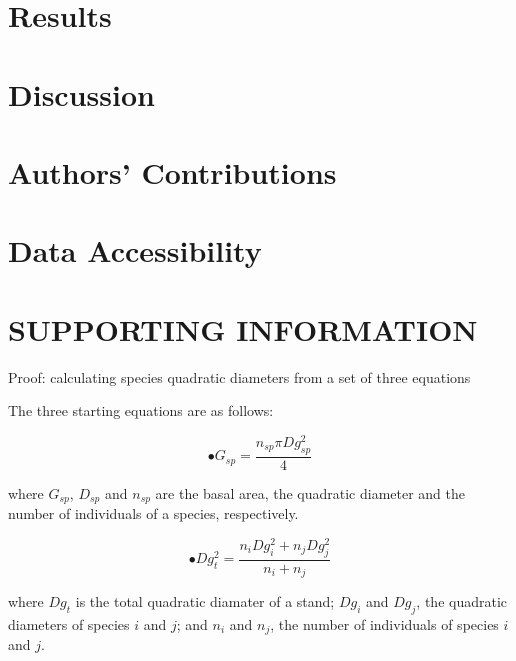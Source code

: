 \documentclass[a4paper]{article}
\begin{document}
\section*{Results}

\section*{Discussion}


\section*{Authors' Contributions}

\section*{Data Accessibility}




\clearpage

\section*{SUPPORTING INFORMATION}


\clearpage

\noindent Proof: calculating species quadratic diameters from a set of three equations

\noindent The three starting equations are as follows:

\begin{equation}\label{one}\tag{a}
  \bullet G_{sp} = \frac{n_{sp}\pi Dg_{sp}^2}{4}
\end{equation}

\noindent where $G_{sp}$, $D_{sp}$ and $n_{sp}$ are the basal area, the quadratic diameter and the number of individuals of a species, respectively.

\begin{equation}\label{two}\tag{b}
  \bullet Dg_t^2 = \frac{n_iDg_i^2 + n_jDg_j^2}{n_i + n_j}
\end{equation}

\noindent where $Dg_t$ is the total quadratic diamater of a stand; $Dg_i$ and $Dg_j$, the quadratic diameters of species $i$ and $j$; and $n_i$ and $n_j$, the number of individuals of species $i$ and $j$.
\end{document}
